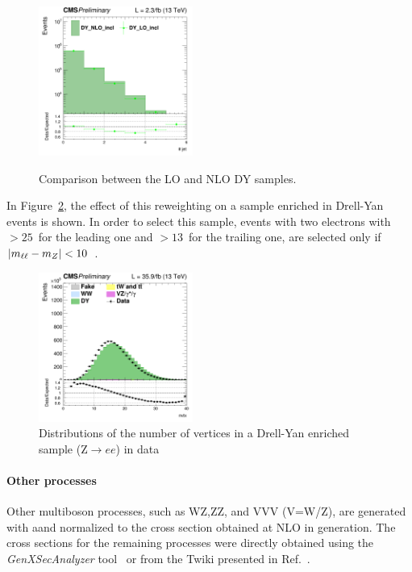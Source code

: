 \begin{figure}[htbp]
{\includegraphics[width=0.45\textwidth]{../AN/Figs/DY/LOvsNLO/log_cratio_dyee_13TeV_njet.png}
}
\caption{
    Comparison between the LO and NLO DY samples.}
    \label{fig:LOvsNLO}
\end{figure}


In Figure~\ref{Fig:pu}, the effect of this reweighting on a sample enriched in Drell-Yan events is shown.
In order to select this sample, 
events with two electrons with \pt$> 25$~\GeV for the leading one and  \pt$>
13$~\GeV for the trailing one, are selected only if  $|m_{\ell\ell} - m_Z| < 10$~\GeV. 

\begin{figure}[htbp]
\centering
\includegraphics[width=0.45\textwidth]{../AN/Figs/nvertices.png}
\caption{
    Distributions of the number of vertices in a Drell-Yan enriched sample
    (Z$\rightarrow{}ee$) in
    data}
    \label{Fig:pu}
\end{figure}





\paragraph{Other processes} Other multiboson processes, such as WZ,ZZ, and VVV (V=W/Z), are generated with a\MCATNLO and normalized
to the cross section obtained at NLO in generation.
The cross sections for the remaining processes were directly obtained using the \emph{GenXSecAnalyzer}
tool~\cite{genxsec} or from the Twiki presented in Ref.~\cite{25nstwiki}.



